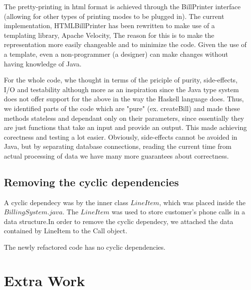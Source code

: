 \documentclass[11pt,twocolumn]{article} %
\begin{document}
The pretty-printing in html format is achieved through the BillPrinter interface (allowing for other types of printing modes to be plugged in).
The current implementation, HTMLBillPrinter has been rewritten to make use of a templating library, Apache Velocity, The reason for this is to make
the representation more easily changeable and to minimize the code. Given the use of a template, even a non-programmer (a designer) can make changes 
without having knowledge of Java.

For the whole code, whe thought in terms of the priciple of purity, side-effects, I/O and testability although more as an inspiration since the
Java type system does not offer support for the above in the way the Haskell language does. Thus, we identified parts of the code which are
"pure" (ex. createBill) and made these methods stateless and dependant only on their parameters, since essentially they are just functions
that take an input and provide an output. This made achieving corectness and testing a lot easier. Obviously, side-effects cannot be avoided in Java,
but by separating database connections, reading the current time from actual processing of data we have many more guarantees about correctness.

\subsection{Removing the cyclic dependencies}
A cyclic dependecy was by the inner class $LineItem$, which was placed inside the $BillingSystem.java$.
The $LineItem$ was used to store customer's phone calls in a data structure.In order to remove the cyclic dependecy, we attached the
data contained by LineItem to the Call object.

The newly refactored code has no cyclic dependencies.

\section{Extra Work}
\end{document}
